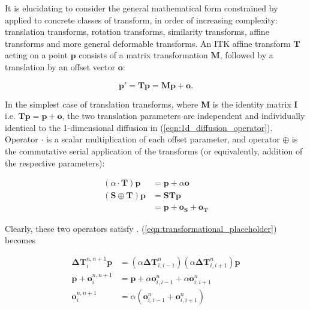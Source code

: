 	  It is elucidating to consider the general mathematical form constrained by  applied to concrete classes of transform, in order of increasing complexity: translation transforms, rotation transforms, similarity transforms, affine transforms and more general deformable transforms. An ITK affine transform $\mathbf{T}$ acting on a point $\mathbf{p}$ consists of a matrix transformation $\mathbf{M}$, followed by a translation by an offset vector $\mathbf{o}$:
		
		\begin{equation}
			\mathbf{p'} = \mathbf{Tp}= \mathbf{Mp} + \mathbf{o}.
		\end{equation}
		
		In the simplest case of translation transforms, where $\mathbf{M}$ is the identity matrix $\mathbf{I}$ i.e. $\mathbf{Tp} = \mathbf{p} + \mathbf{o}$, the two translation parameters are independent and individually identical to the 1-dimensional diffusion in (\ref{eqn:1d_diffusion_operator}). Operator $\cdot$ is a scalar multiplication of each offset parameter, and operator $\oplus$ is the commutative serial application of the transforms (or equivalently, addition of the respective parameters):
		
		\begin{align}
			(\alpha \cdot \mathbf{T}) \mathbf{p} &= \mathbf{p} + \alpha\mathbf{o} \label{eqn:translation_cdot}\\
			(\mathbf{S} \oplus \mathbf{T}) \mathbf{p} &= \mathbf{STp} \\
			                                          &= \mathbf{p} + \mathbf{o_S} + \mathbf{o_T} \label{eqn:translation_oplus}
		\end{align}
		
		Clearly, these two operators satisfy . (\ref{eqn:transformational_placeholder}) becomes
		
		\begin{align}
		 	\mathbf{\Delta T}_i^{n,n+1} \mathbf{p} &= (\alpha \mathbf{\Delta T}_{i,i-1}^n) (\alpha \mathbf{\Delta T}_{i,i+1}^n) \mathbf{p} \\
			\mathbf{p} + \mathbf{o}_i^{n,n+1} &= \mathbf{p} + \alpha \mathbf{o}_{i,i-1}^n + \alpha \mathbf{o}_{i,i+1}^n \\
			\mathbf{o}_i^{n,n+1} &= \alpha (\mathbf{o}_{i,i-1}^n + \mathbf{o}_{i,i+1}^n) 
		\end{align}
		
